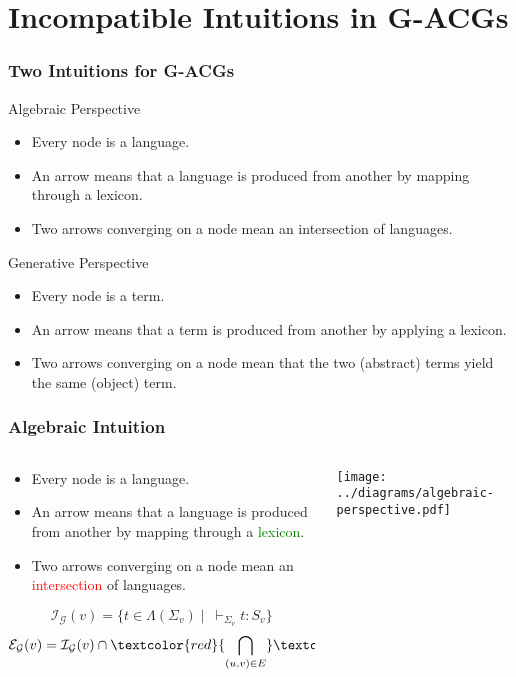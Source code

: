 \documentclass{beamer}
\begin{document}
\section{Incompatible Intuitions in G-ACGs}

\begin{frame}
  \frametitle{Two Intuitions for G-ACGs}

  \begin{block}{Algebraic Perspective}
    \begin{itemize}
    \item Every node is a language.
    \item An arrow means that a language is produced from another by
      mapping through a lexicon.
    \item Two arrows converging on a node mean an intersection of
      languages.
    \end{itemize}
  \end{block}
  \begin{block}{Generative Perspective}
    \begin{itemize}
    \item Every node is a term.
    \item An arrow means that a term is produced from another by
      applying a lexicon.
    \item Two arrows converging on a node mean that the two (abstract)
      terms yield the same (object) term.
    \end{itemize}
  \end{block}
\end{frame}


\begin{frame}
  \frametitle{Algebraic Intuition}

  \begin{columns}[c]
    \begin{column}{0.7\textwidth}
      \begin{itemize}
      \item Every node is a language.
      \item An arrow means that a language is produced from another by
        mapping through a \textcolor{green}{lexicon}.
      \item Two arrows converging on a node mean an
        \textcolor{red}{intersection} of languages.
      \end{itemize}

$$
\mathcal{I}_{\mathcal{G}}(v) = \{t \in \Lambda(\Sigma_v)
\mid\ \vdash_{\Sigma_v} t : S_v\}
$$
$$
\mathcal{E}_{\mathcal{G}}(v) = \mathcal{I}_{\mathcal{G}}(v) \cap
\textcolor{red}{\bigcap_{(u,v) \in E}}
\textcolor{green}{\mathcal{L}_{(u,v)}}(\mathcal{E}_{\mathcal{G}}(u)).
$$
    \end{column}
    \begin{column}{0.3\textwidth}
      \texttt{[image: ../diagrams/algebraic-perspective.pdf]}
    \end{column}
  \end{columns}

\end{frame}
\end{document}
